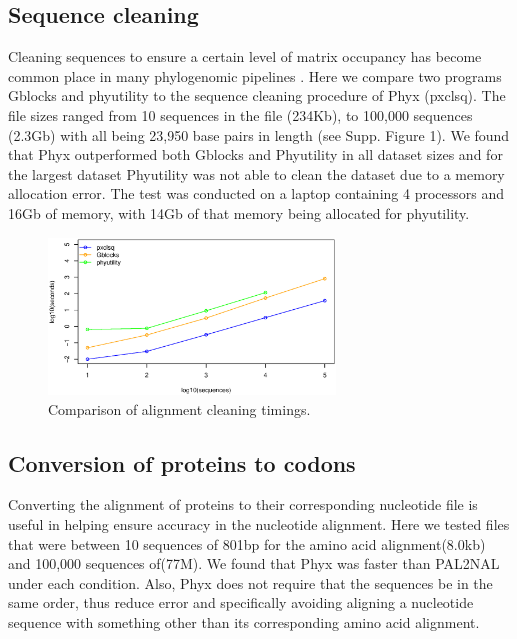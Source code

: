 \documentclass{article}
\begin{document}
\subsection{Sequence cleaning}
Cleaning sequences to ensure a certain level of matrix occupancy has become common place in many phylogenomic pipelines \citep{Dunn2013,YangSmith2014}. Here we compare two programs Gblocks \citep{Gblocks} and phyutility \citep{SmithDunn2008} to the sequence cleaning procedure of Phyx (pxclsq). The file sizes ranged from 10 sequences in the file (234Kb), to 100,000 sequences (2.3Gb) with all being 23,950 base pairs in length (see Supp. Figure 1). 
We found that Phyx outperformed both Gblocks and Phyutility in all dataset sizes and for the largest dataset Phyutility was not able to clean the dataset due to a memory allocation error. The test was conducted on a laptop  containing 4 processors and 16Gb of memory, with 14Gb of that memory being allocated for phyutility.

\begin{figure}[H]
    \centering
    \includegraphics[width=3.0in]{clsq.eps}
    \caption{Comparison of alignment cleaning timings.}
    \label{cleaningfigure}
\label{fig:S1}
\end{figure}

\subsection{Conversion of proteins to codons}
Converting the alignment of proteins to their corresponding nucleotide file is useful in helping ensure accuracy in the nucleotide alignment. Here we tested files that were between 10 sequences of 801bp for the amino acid alignment(8.0kb) and 100,000 sequences of(77M). We found that Phyx was faster than PAL2NAL\cite{Suyama2006} under each condition. Also, Phyx does not require that the sequences be in the same order, thus reduce error and specifically avoiding aligning a nucleotide sequence with something other than its corresponding amino acid alignment.
\end{document}
